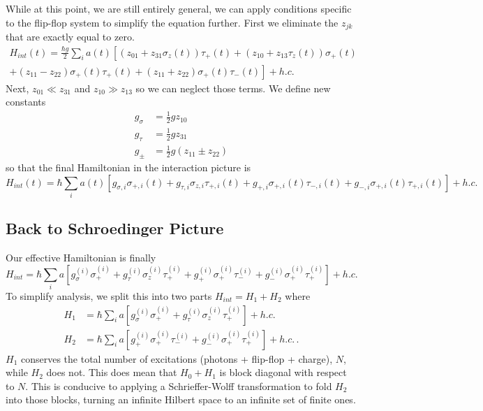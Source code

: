 \documentclass[
    preprint,
    amsmath,amssymb,
    aps,
    prb,
    floatfix,
]{revtex4-2}
\begin{document}
    While at this point, we are still entirely general, we can apply conditions specific to the flip-flop system to simplify the equation further. First we eliminate the $z_{jk}$ that are exactly equal to zero.
    \begin{multline}
        H_{int}(t) = \frac{\hbar g}{2}\sum_i a(t)\left[ (z_{01}+z_{31}\sigma_z(t))\tau_+(t) + (z_{10}+z_{13}\tau_z(t))\sigma_+(t) \right. \\
        \left.  +( z_{11}-z_{22})\sigma_+(t)\tau_+(t)+(z_{11}+z_{22})\sigma_+(t)\tau_-(t)\right] + h.c.
    \end{multline}
    Next, $z_{01} \ll z_{31}$ and $z_{10} \gg z_{13}$ so we can neglect those terms. We define new constants
    \begin{align}
        g_\sigma &= \frac{1}{2}gz_{10} \\
        g_\tau &= \frac{1}{2}gz_{31} \\
        g_\pm &= \frac{1}{2}g(z_{11}\pm z_{22}) 
    \end{align}
    so that the final Hamiltonian in the interaction picture is
    \begin{equation}
        H_{int}(t) = \hbar\sum_ia(t)\left[ g_{\sigma,i}\sigma_{+,i}(t)+g_{\tau,i}\sigma_{z,i}\tau_{+,i}(t) + g_{+,i}\sigma_{+,i}(t)\tau_{-,i}(t) + g_{-,i}\sigma_{+,i}(t)\tau_{+,i}(t) \right] + h.c.
    \end{equation}
    
    \subsection{Back to Schroedinger Picture}
    Our effective Hamiltonian is finally
    \begin{equation}
        H_{int} = \hbar\sum_ia\left[ g_{\sigma}^{(i)}\sigma_{+}^{(i)}+g_{\tau}^{(i)}\sigma_{z}^{(i)}\tau_{+}^{(i)} + g_{+}^{(i)}\sigma_{+}^{(i)}\tau_{-}^{(i)} + g_{-}^{(i)}\sigma_{+}^{(i)}\tau_{+}^{(i)} \right] + h.c.
    \end{equation}
    To simplify analysis, we split this into two parts $H_{int} = H_1 + H_2$ where
    \begin{align}
        H_1 &= \hbar\sum_ia\left[ g_{\sigma}^{(i)}\sigma_{+}^{(i)}+g_{\tau}^{(i)}\sigma_{z}^{(i)}\tau_{+}^{(i)} \right] + h.c. \\
        H_2 &= \hbar\sum_ia\left[ g_{+}^{(i)}\sigma_{+}^{(i)}\tau_{-}^{(i)} + g_{-}^{(i)}\sigma_{+}^{(i)}\tau_{+}^{(i)} \right] + h.c. \,.
    \end{align}
    $H_1$ conserves the total number of excitations (photons + flip-flop + charge), $N$, while $H_2$ does not. This does mean that $H_0 + H_1$ is block diagonal with respect to $N$. This is conducive to applying a Schrieffer-Wolff transformation to fold $H_2$ into those blocks, turning an infinite Hilbert space to an infinite set of finite ones.
\end{document}
